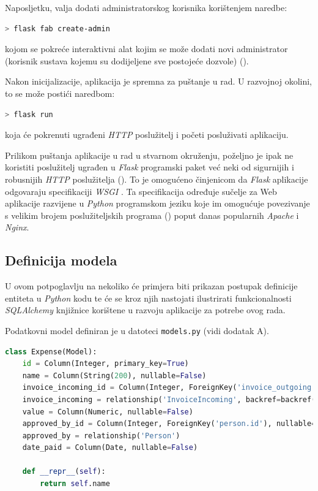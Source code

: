 \documentclass[times, utf8, diplomski]{fer}
\begin{document}
Naposljetku, valja dodati administratorskog korisnika korištenjem naredbe:
\begin{lstlisting}[language=bash,basicstyle=\small\ttfamily,columns=flexible]
 > flask fab create-admin
\end{lstlisting}
\noindent kojom se pokreće interaktivni alat kojim se može dodati novi
administrator (korisnik sustava kojemu su dodijeljene sve postojeće dozvole)
(\cite{fab}).

Nakon inicijalizacije, aplikacija je spremna za puštanje u rad. U razvojnoj
okolini, to se može postići naredbom:
\begin{lstlisting}[language=bash,basicstyle=\small\ttfamily,columns=flexible]
 > flask run
\end{lstlisting}
\noindent koja će pokrenuti ugrađeni \emph{HTTP} poslužitelj i početi
posluživati aplikaciju.

Prilikom puštanja aplikacije u rad u stvarnom okruženju, poželjno je ipak ne
koristiti poslužitelj ugrađen u \emph{Flask} programski paket već neki od
sigurnijih i robusnijih \emph{HTTP} poslužitelja (\cite{flask}). To je omogućeno
činjenicom da \emph{Flask} aplikacije odgovaraju specifikaciji \emph{WSGI}
. Ta specifikacija određuje sučelje za Web
aplikacije razvijene u \emph{Python} programskom jeziku koje im omogućuje
povezivanje s velikim brojem poslužiteljskih programa (\cite{pepwsgi}) poput
danas popularnih \emph{Apache} i \emph{Nginx}.

\subsection{Definicija modela}

U ovom potpoglavlju na nekoliko će primjera biti prikazan postupak definicije
entiteta u \emph{Python} kodu te će se kroz njih nastojati ilustrirati
funkcionalnosti \emph{SQLAlchemy} knjižnice korištene u razvoju aplikacije za
potrebe ovog rada.

Podatkovni model definiran je u datoteci \texttt{models.py} (vidi dodatak A).

\begin{lstlisting}[language=Python,basicstyle=\scriptsize,frame=single,caption={
kod entiteta \emph{Expense}},label={lst:expensemodel}]
class Expense(Model):
    id = Column(Integer, primary_key=True)
    name = Column(String(200), nullable=False)
    invoice_incoming_id = Column(Integer, ForeignKey('invoice_outgoing.id'))
    invoice_incoming = relationship('InvoiceIncoming', backref=backref('expense'))
    value = Column(Numeric, nullable=False)
    approved_by_id = Column(Integer, ForeignKey('person.id'), nullable=False)
    approved_by = relationship('Person')
    date_paid = Column(Date, nullable=False)

    def __repr__(self):
        return self.name
\end{lstlisting}
\end{document}
